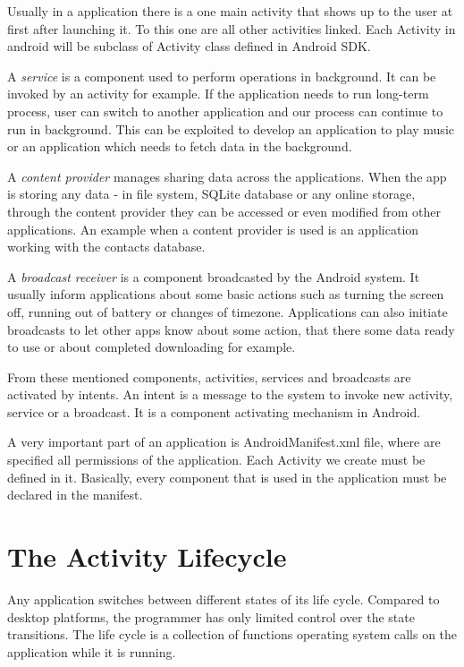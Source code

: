 Usually in a application there is a one main activity that shows up to the user at first after launching it.
To this one are all other activities linked.
Each Activity in android will be subclass of Activity class defined in Android SDK.

A \emph{service} is a component used to perform operations in background.
It can be invoked by an activity for example.
If the application needs to run long-term process, user can switch to another application and our process can continue to run in background.
This can be exploited to develop an application to play music or an application which needs to fetch data in the background.

A \emph{content provider} manages sharing data across the applications.
When the app is storing any data - in file system, SQLite database or any online storage, through the content provider they can be accessed or even modified from other applications.
An example when a content provider is used is an application working with the contacts database.

A \emph{broadcast receiver} is a component broadcasted by the Android system.
It usually inform applications about some basic actions such as turning the screen off, running out of battery or changes of timezone.
Applications can also initiate broadcasts to let other apps know about some action, that there some data ready to use or about completed downloading for example.

From these mentioned components, activities, services and broadcasts are activated by intents.
An intent is a message to the system to invoke new activity, service or a broadcast.
It is a component activating mechanism in Android.

A very important part of an application is AndroidManifest\@.xml file, where are specified all permissions of the application.
Each Activity we create must be defined in it. Basically, every component that is used in the application must be declared in the manifest.


\section{The Activity Lifecycle}
Any application switches between different states of its life cycle. 
Compared to desktop platforms, the programmer has only limited control over the state transitions.
The life cycle is a collection of functions operating system calls on the application while it is running.

